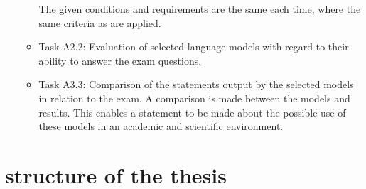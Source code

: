 \begin{itemize}
\begin{itemize}
          The given conditions and requirements are the same each time, where the same criteria as \citet{Paul_Keller} are applied.
          \item Task A2.2: Evaluation of selected language models with regard to their ability to answer the exam questions.
          \item Task A3.3:
          Comparison of the statements output by the selected models in relation to the exam.
          A comparison is made between the models and \citet{Paul_Keller} results.
          This enables a statement to be made about the possible use of these models in an academic and scientific environment.
        \end{itemize}
\end{itemize}



\section{structure of the thesis}